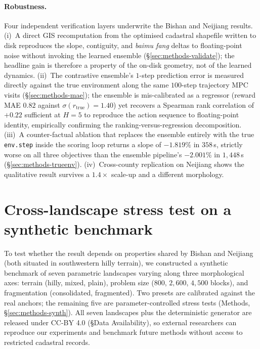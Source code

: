 \documentclass[11pt]{article}
\begin{document}
\paragraph{Robustness.} Four independent verification layers underwrite the Bishan and Neijiang results. (i)~A direct GIS recomputation from the optimised cadastral shapefile written to disk reproduces the slope, contiguity, and \textit{baimu fang} deltas to floating-point noise without invoking the learned ensemble (\S\ref{sec:methods-validate}); the headline gain is therefore a property of the on-disk geometry, not of the learned dynamics. (ii)~The contrastive ensemble's $1$-step prediction error is measured directly against the true environment along the same $100$-step trajectory MPC visits (\S\ref{sec:methods-mae}); the ensemble is mis-calibrated as a regressor (reward MAE $0.82$ against $\sigma(r_{\text{true}})=1.40$) yet recovers a Spearman rank correlation of $+0.22$ sufficient at $H{=}5$ to reproduce the action sequence to floating-point identity, empirically confirming the ranking-versus-regression decomposition. (iii)~A counter-factual ablation that replaces the ensemble entirely with the true \texttt{env.step} inside the scoring loop returns a slope of $-1.819\%$ in $358$\,s, strictly worse on all three objectives than the ensemble pipeline's $-2.001\%$ in $1{,}448$\,s (\S\ref{sec:methods-trueenv}). (iv)~Cross-county replication on Neijiang shows the qualitative result survives a $1.4\times$ scale-up and a different morphology.

\section{Cross-landscape stress test on a synthetic benchmark}\label{sec:bench}

To test whether the result depends on properties shared by Bishan and Neijiang (both situated in southwestern hilly terrain), we constructed a synthetic benchmark of seven parametric landscapes varying along three morphological axes: terrain (hilly, mixed, plain), problem size ($800$, $2{,}600$, $4{,}500$ blocks), and fragmentation (consolidated, fragmented). Two presets are calibrated against the real anchors; the remaining five are parameter-controlled stress tests (Methods, \S\ref{sec:methods-synth}). All seven landscapes plus the deterministic generator are released under CC-BY 4.0 (\S Data Availability), so external researchers can reproduce our experiments and benchmark future methods without access to restricted cadastral records.
\end{document}

